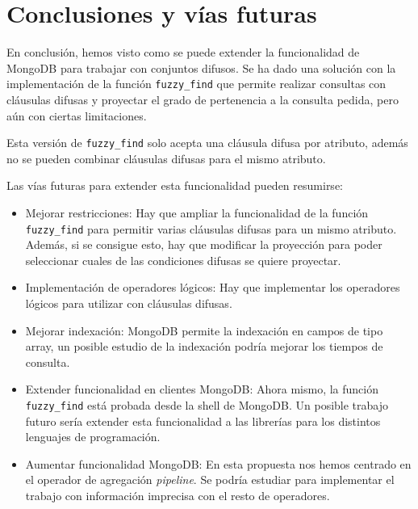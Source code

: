 \section{Conclusiones y vías futuras}

En conclusión, hemos visto como se puede extender la funcionalidad de MongoDB para trabajar con conjuntos difusos. Se ha dado una solución con la implementación de la función \texttt{fuzzy\_find} que permite realizar consultas con cláusulas difusas y proyectar el grado de pertenencia a la consulta pedida, pero aún con ciertas limitaciones.

Esta versión de \texttt{fuzzy\_find} solo acepta una cláusula difusa por atributo, además no se pueden combinar cláusulas difusas para el mismo atributo.

Las vías futuras para extender esta funcionalidad pueden resumirse:

\begin{itemize}
    \item Mejorar restricciones: Hay que ampliar la funcionalidad de la función \texttt{fuzzy\_find} para permitir varias cláusulas difusas para un mismo atributo. Además, si se consigue esto, hay que modificar la proyección para poder seleccionar cuales de las condiciones difusas se quiere proyectar.
    \item Implementación de operadores lógicos: Hay que implementar los operadores lógicos para utilizar con cláusulas difusas.
    \item Mejorar indexación: MongoDB permite la indexación en campos de tipo array, un posible estudio de la indexación podría mejorar los tiempos de consulta.
    \item Extender funcionalidad en clientes MongoDB: Ahora mismo, la función \texttt{fuzzy\_find} está probada desde la shell de MongoDB. Un posible trabajo futuro sería extender esta funcionalidad a las librerías para los distintos lenguajes de programación.
    \item Aumentar funcionalidad MongoDB: En esta propuesta nos hemos centrado en el operador de agregación \textit{pipeline}. Se podría estudiar para implementar el trabajo con información imprecisa con el resto de operadores.
\end{itemize}